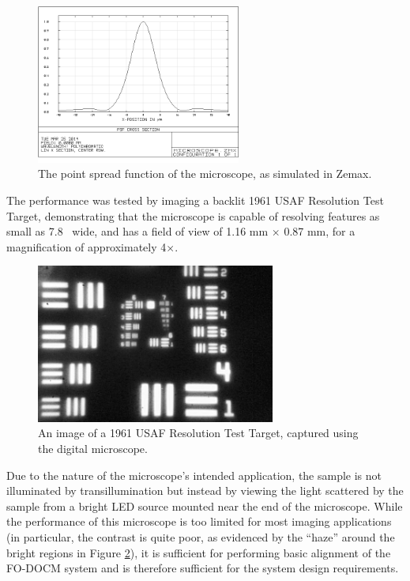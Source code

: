 \begin{figure}[h!]
\centering
\includegraphics[width=0.6\textwidth]{Images/Zemax/microscope_psf_2.png}
\caption[The point spread function of the microscope, as simulated in Zemax.]{The point spread function of the microscope, as simulated in Zemax.\label{fig:microscope_psf}}
\end{figure}

The performance was tested by imaging a backlit 1961 USAF Resolution Test Target, demonstrating that the microscope is capable of resolving features as small as 7.8 \micron~wide, and has a field of view of 1.16 mm $\times$ 0.87 mm, for a magnification of approximately 4$\times$.

\begin{figure}[h!]
\centering
\includegraphics[width=0.7\textwidth]{Images/Microscope/target2.png}
\caption{An image of a 1961 USAF Resolution Test Target, captured using the digital microscope. \label{fig:usaf}}
\end{figure}

Due to the nature of the microscope's intended application, the sample is not illuminated by transillumination but instead by viewing the light scattered by the sample from a bright LED source mounted near the end of the microscope. While the performance of this microscope is too limited for most imaging applications (in particular, the contrast is quite poor, as evidenced by the ``haze'' around the bright regions in Figure \ref{fig:usaf}), it is sufficient for performing basic alignment of the FO-DOCM system and is therefore sufficient for the system design requirements.

